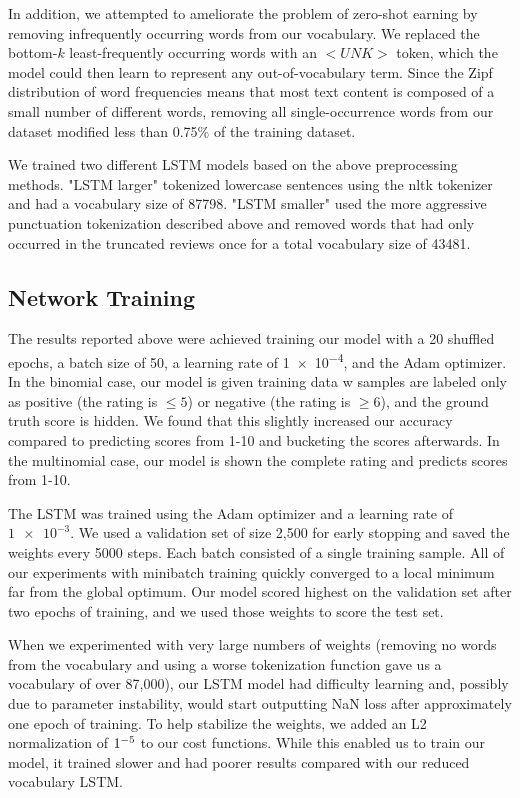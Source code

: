 \documentclass[conference]{IEEEtran}
\begin{document}
    In addition, we attempted to ameliorate the problem of zero-shot earning by removing 
    infrequently occurring words from our vocabulary. We replaced the bottom-$k$ 
    least-frequently occurring words with an $<UNK>$ token, which the model could then
    learn to represent any out-of-vocabulary term. Since the Zipf distribution of word frequencies
    means that most text content is composed of a small number of different words, removing all
    single-occurrence words from our dataset modified less than 0.75\% of the training dataset.
     
    We trained two different LSTM models based on the above preprocessing methods.
    "LSTM larger" tokenized lowercase sentences using the nltk tokenizer and had a
    vocabulary size of 87798. "LSTM smaller" used the more aggressive punctuation tokenization
    described above and removed words that had only occurred in the truncated reviews once
    for a total vocabulary size of 43481.

   
\subsection{Network Training}
The results reported
    above were achieved training our model with a 20 shuffled epochs, a
    batch size of 50, a learning rate of \num{1e-4}, and the Adam optimizer.
    In the binomial case, our model is given training data w samples are
    labeled only as positive (the rating is $\leq 5$) or negative (the rating is
    $\geq 6$), and the ground truth score is hidden. We found that this slightly
    increased our accuracy compared to predicting scores from 1-10 and
    bucketing the scores afterwards. In the multinomial case, our model is
    shown the complete rating and predicts scores from 1-10.



    The LSTM was trained using the Adam optimizer and a learning rate of $\num{1e-3}$. We used a
    validation set of size 2,500 for early stopping and saved the weights every 5000 steps. Each
    batch consisted of a single training sample. All of our experiments with minibatch training 
    quickly converged to a local minimum far from the global optimum. Our model scored highest 
    on the validation set after two epochs of training, and we used those weights to score the test set.
    
    When we experimented with very large numbers of weights (removing no words from the 
    vocabulary and using a worse tokenization function gave us a vocabulary of over 87,000),
    our LSTM model had difficulty learning and, possibly due to parameter instability, would start
    outputting NaN loss after approximately one epoch of training. To help stabilize the weights,
    we added an L2 normalization of $1\time10^{-5}$ to our cost functions. While this enabled us
    to train our model, it trained slower and had poorer results compared with our reduced vocabulary 
    LSTM.
\end{document}
